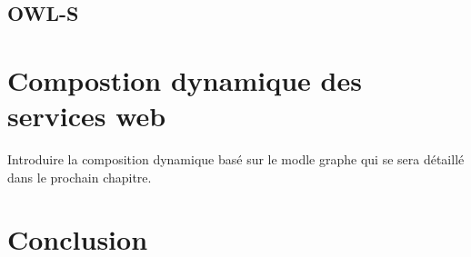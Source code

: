 


    \subsection{OWL-S}
    \label{sec:owl-s}
    \cite{mcilraith2003bringing}

  \section{Compostion dynamique des services web}
  \label{sec:comp-dynam}

  Introduire la composition dynamique basé sur le modle graphe qui se
  sera détaillé dans le prochain chapitre.
  \section{Conclusion}
  \label{sec:conclusion}
 

